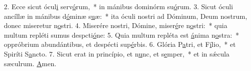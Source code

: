 2. Ecce sicut ócul\uline{i} serv\uline{ó}rum,~* in mánibus dominórm su\uline{ó}rum.
3. Sicut óculi ancíllæ in mánibus d\uline{ó}minæ s\uline{u}æ:~* ita óculi nostri ad Dóminum, Deum nostrum, donec miseretur n\uline{o}stri.
4. Miserére nostri, Dómine, miser\uline{é}re n\uline{o}stri:~* quia multum repléti sumus despcti\uline{ó}ne:
5. Quia multum repléta est \uline{á}nima n\uline{o}stra:~* oppróbrium abundántibus, et despécti sup\uline{é}rbis.
6. Glória P\uline{a}tri, et F\uline{í}lio,~* et Spiríti S\uline{a}ncto.
7. Sicut erat in princípio, et n\uline{u}nc, et s\uline{e}mper,~* et in sǽcula sæculrum. \uline{A}men.
